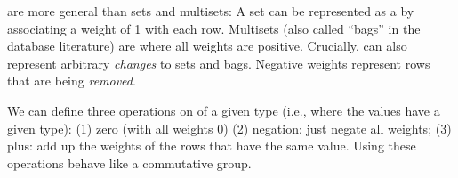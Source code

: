 
\zrs are more general than sets and multisets: A set can be
represented as a \zr by associating a weight of 1 with each row.
Multisets (also called ``bags'' in the database literature) are \zrs
where all weights are positive.  Crucially, \zrs can also represent
arbitrary \emph{changes} to sets and bags.  Negative weights represent
rows that are being \emph{removed}.

We can define three operations on \zr of a given type (i.e., where
the values have a given type): (1) zero (with all weights 0) (2)
negation: just negate all weights; (3) plus: add up the weights of the
rows that have the same value.  Using these operations \zrs behave
like a commutative group.



%
%

